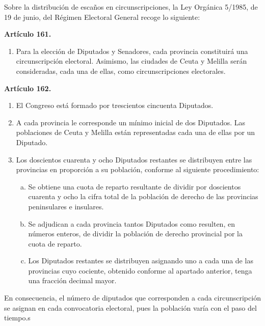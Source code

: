 \documentclass[11pt]{article}
\newcommand\console[1]{{\inconsolata #1}}
\begin{document}
	Sobre la distribución de escaños en circunscripciones, la Ley Orgánica 5/1985, de 19 de junio, del Régimen Electoral General recoge lo siguiente: \\
	\console{
	\begin{leftbar}
		\textbf{Artículo 161.}
		
		\begin{enumerate}
			\item Para la elección de Diputados y Senadores, cada provincia constituirá una circunscripción electoral. Asimismo, las ciudades de Ceuta y Melilla serán consideradas, cada una de ellas, como circunscripciones electorales.
		\end{enumerate}
		
		\textbf{Artículo 162.}
		
		\begin{enumerate}
			\item El Congreso está formado por trescientos cincuenta Diputados.
			\item A cada provincia le corresponde un mínimo inicial de dos Diputados. Las poblaciones de Ceuta y Melilla están representadas cada una de ellas por un Diputado.
			\item Los doscientos cuarenta y ocho Diputados restantes se distribuyen entre las provincias en proporción a su población, conforme al siguiente procedimiento:
				\begin{enumerate}[a)]
					\item Se obtiene una cuota de reparto resultante de dividir por doscientos cuarenta y ocho la cifra total de la población de derecho de las provincias peninsulares e insulares.
					\item Se adjudican a cada provincia tantos Diputados como resulten, en números enteros, de dividir la población de derecho provincial por la cuota de reparto.
					\item Los Diputados restantes se distribuyen asignando uno a cada una de las provincias cuyo cociente, obtenido conforme al apartado anterior, tenga una fracción decimal mayor. \\
				\end{enumerate}
		\end{enumerate}
	\end{leftbar}
	}
	
	

	En consecuencia, el número de diputados que corresponden a cada circunscripción se asignan en cada convocatoria electoral, pues la población varía con el paso del tiempo.s
	
\end{document}
